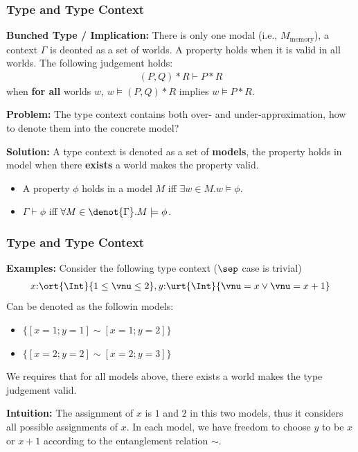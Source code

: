 \begin{frame}[fragile]
    \frametitle{Type and Type Context}

\textbf{Bunched Type / Implication:} There is only one modal (i.e., $M_\text{memory}$), a context $\Gamma$ is deonted as a set of worlds. A property holds when it is valid in all worlds. The following judgement holds:
\begin{align*}
    (P, Q) * R \vdash P * R 
\end{align*}\noindent
when \textbf{for all} worlds $w$, $w \models (P, Q) * R$ implies $w \models P * R$.

\textbf{Problem:} The type context contains both over- and under-approximation, how to denote them into the concrete model?

\textbf{Solution:} A type context is denoted as a set of \textbf{models}, the property holds in model when there \textbf{exists} a world makes the property valid.
\begin{itemize}
    \item A property $\phi$ holds in a model $M$ iff $\exists w \in M. w \models \phi$.
    \item $\Gamma \vdash \phi$ iff $\forall M \in \denot{\Gamma}. M \models \phi$.
\end{itemize}
\end{frame}

\begin{frame}[fragile]
    \frametitle{Type and Type Context}

\textbf{Examples:} Consider the following type context ($\sep$ case is trivial)
\begin{align*}
    x{:}\ort{\Int}{1 \leq \vnu \leq 2}, y{:}\urt{\Int}{\vnu = x \lor \vnu = x + 1}
\end{align*}\noindent
Can be denoted as the followin models:
\begin{itemize}
    \item $\{[x=1;y=1] \sim [x=1;y=2]\}$
    \item $\{[x=2;y=2] \sim [x=2;y=3]\}$
\end{itemize}
We requires that for all models above, there exists a world makes the type judgement valid.

\textbf{Intuition:} The assignment of $x$ is $1$ and $2$ in this two models, thus it considers all possible assignments of $x$. In each model, we have freedom to choose $y$ to be $x$ or $x + 1$ according to the entanglement relation $\sim$.
\end{frame}

